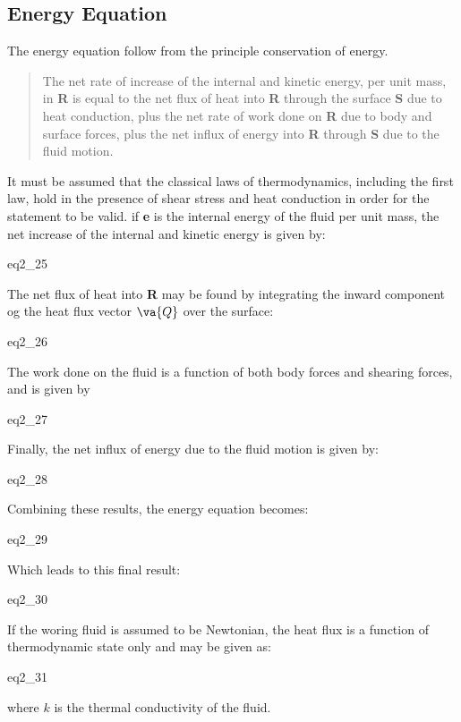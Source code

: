 \subsection{Energy Equation}

The energy equation follow from the principle conservation of energy.

\begin{quote} 
  The net rate of increase of the internal and kinetic energy, per
  unit mass, in {\bf R} is equal to the net flux of heat into {\bf R} through the
  surface {\bf S} due to heat conduction, plus the net rate of work done on {\bf R} due
  to body and surface forces, plus the net influx of energy into {\bf R} through
  {\bf S} due to the fluid motion.  
\end{quote}

It must be assumed that the classical laws of thermodynamics, including the
first law, hold in the presence of shear stress and heat conduction in order
for the statement to be valid. if {\bf e} is the internal energy of the fluid per
unit mass, the net increase of the internal and kinetic energy is given by:

{eq2_25}

The net flux of heat into {\bf R} may be found by integrating the inward component
og the heat flux vector $\va{Q}$ over the surface:


{eq2_26}

The work done on the fluid is a function of both body forces and shearing
forces, and is given by

{eq2_27}

Finally, the net influx of energy due to the fluid motion is given by:

{eq2_28}

Combining these results, the energy equation becomes:

{eq2_29}

Which leads to this final result:

{eq2_30}

If the woring fluid is assumed to be Newtonian, the heat flux is a function of thermodynamic state only and may be given as:

{eq2_31}

where $k$ is the thermal conductivity of the fluid.


